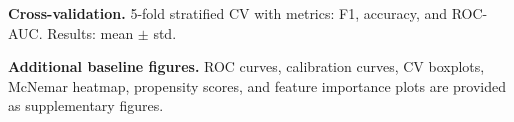 \begin{table}[H]
\textbf{Cross-validation.} 5-fold stratified CV with metrics: F1, accuracy, and ROC-AUC. Results: mean $\pm$ std.

\textbf{Additional baseline figures.} ROC curves, calibration curves, CV boxplots, McNemar heatmap, propensity scores, and feature importance plots are provided as supplementary figures.
\end{table}
